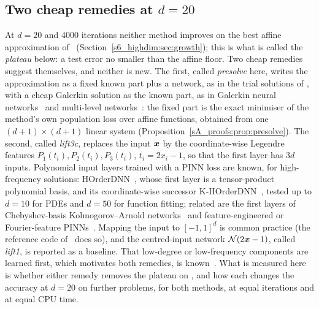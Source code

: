 \FloatBarrier
\subsection{Two cheap remedies at \texorpdfstring{$d=20$}{d = 20}}%
\label{s6_highdim:sec:remedies}

At $d=20$ and 4000 iterations neither method improves on the best affine approximation of
\Ptwo\ (Section~\ref{s6_highdim:sec:growth}); this is what is called the \emph{plateau} below: a
test error no smaller than the affine floor. Two cheap remedies suggest themselves, and neither
is new. The first, called \emph{presolve} here, writes the approximation as a fixed known part
plus a network, as in the trial solutions of \citet{lagaris1998}, with a cheap Galerkin solution
as the known part, as in Galerkin neural networks~\citep{ainsworth2021galerkin} and multi-level
networks~\citep{aldirany2024multilevel}: the fixed part is the exact minimiser of the method's own
population loss over affine functions, obtained from one $(d+1)\times(d+1)$ linear system
(Proposition~\ref{sA_proofs:prop:presolve}). The second, called \emph{lift3c}, replaces the input
$\boldsymbol{x}$ by the coordinate-wise Legendre features $P_1(t_i),P_2(t_i),P_3(t_i)$, $t_i=2x_i-1$, so that
the first layer has $3d$ inputs. Polynomial input layers trained with a PINN loss are known, for
high-frequency solutions: HOrderDNN~\citep{chang2022horderdnn}, whose first layer is a
tensor-product polynomial basis, and its coordinate-wise successor
K-HOrderDNN~\citep{zhang2025khorderdnn}, tested up to $d=10$ for PDEs and $d=50$ for function
fitting; related are the first layers of Chebyshev-basis Kolmogorov--Arnold
networks~\citep{shukla2024kan,mostajeran2025scaledcpikan} and feature-engineered or Fourier-feature
PINNs~\citep{fazliani2025safenet,wangwang2021}. Mapping the input to $[-1,1]^d$ is common practice
(the reference code of~\citet{raissi2019} does so), and the centred-input network $\mathcal N(2\boldsymbol{x}-1)$,
called \emph{lift1}, is reported as a baseline. That low-degree or low-frequency components are
learned first, which motivates both remedies, is known~\citep{rahaman2019,ghosh2022three,wangwang2021}.
What is measured here is whether either remedy removes the plateau on \Ptwo, and how each changes
the accuracy at $d=20$ on further problems, for both methods, at equal iterations and at equal CPU
time.

